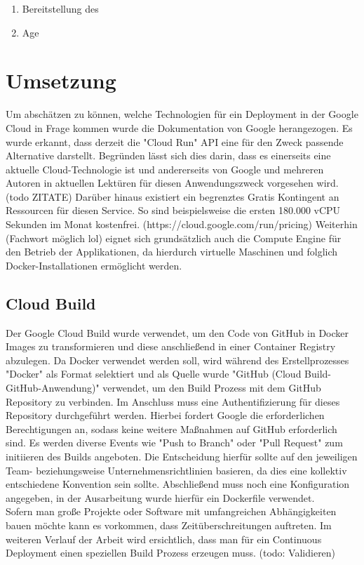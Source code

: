 \documentclass[pdftex,a4paper,abstracton,11pt,parskip=half,bibtotocnumbered]{scrartcl}
\begin{document}
\begin{enumerate}
	\item Bereitstellung des  
	\item Age
\end{enumerate}

\section{Umsetzung}
	Um abschätzen zu können, welche Technologien für ein Deployment in der Google Cloud in Frage kommen wurde die Dokumentation von Google herangezogen.
	Es wurde erkannt, dass derzeit die "Cloud Run" API eine für den Zweck passende Alternative darstellt. Begründen lässt sich dies darin, dass es einerseits 
	eine aktuelle Cloud-Technologie ist und andererseits von Google und mehreren Autoren in aktuellen Lektüren für diesen Anwendungszweck vorgesehen wird.(todo ZITATE)
	Darüber hinaus existiert ein begrenztes Gratis Kontingent an Ressourcen für diesen Service. So sind beispielsweise die ersten 180.000 vCPU Sekunden 
	im Monat kostenfrei. (https://cloud.google.com/run/pricing)
	Weiterhin (Fachwort möglich lol) eignet sich grundsätzlich auch die Compute Engine für den Betrieb der Applikationen, da hierdurch virtuelle Maschinen
	und folglich Docker-Installationen ermöglicht werden.

	\subsection{Cloud Build}
	Der Google Cloud Build wurde verwendet, um den Code von GitHub in Docker Images zu transformieren und diese anschließend in einer Container Registry 
	abzulegen. Da Docker verwendet werden soll, wird während des Erstellprozesses "Docker" als Format selektiert und als Quelle wurde "GitHub 
	(Cloud Build-GitHub-Anwendung)" verwendet, um den Build Prozess mit dem GitHub Repository zu verbinden. Im Anschluss muss eine Authentifizierung für dieses
	Repository durchgeführt werden. Hierbei fordert Google die erforderlichen Berechtigungen an, sodass keine weitere Maßnahmen auf GitHub erforderlich sind. 
	Es werden diverse Events wie "Push to Branch" oder "Pull Request" zum initiieren des Builds angeboten. Die Entscheidung hierfür sollte auf den
	jeweiligen Team- beziehungsweise Unternehmensrichtlinien basieren, da dies eine kollektiv entschiedene Konvention sein sollte.
	Abschließend muss noch eine Konfiguration angegeben, in der Ausarbeitung wurde hierfür ein Dockerfile verwendet.\\
	Sofern man große Projekte oder Software mit umfangreichen Abhängigkeiten bauen möchte kann es vorkommen, dass Zeitüberschreitungen auftreten.  
	Im weiteren Verlauf der Arbeit wird ersichtlich, dass man für ein Continuous Deployment einen speziellen Build Prozess erzeugen muss. (todo: Validieren)
\end{document}

